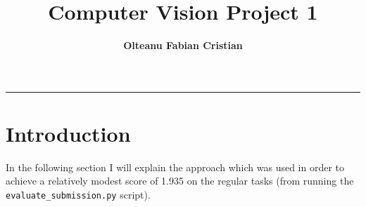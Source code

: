\documentclass{article}
\author{\textbf{Olteanu Fabian Cristian}}
\affil{FMI, AI Master, Year 1
}
\title{\textbf{\huge Computer Vision Project 1}}
\date{}
\begin{document}
\pagestyle{headings}	
\newpage
\setcounter{page}{1}
\renewcommand{\thepage}{\arabic{page}}


	
	
\setlength{\parskip}{0.5em}
	
\maketitle
	
\noindent\rule{15cm}{0.4pt}

\section{Introduction}
In the following section I will explain the approach which was used in order to achieve a relatively modest score of 1.935 on the regular tasks (from running the \texttt{evaluate\_submission.py} script).
\end{document}
